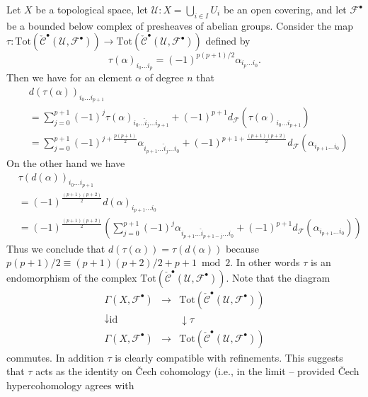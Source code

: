 \noindent
Let $X$ be a topological space, let $\mathcal{U} : X = \bigcup_{i \in I} U_i$
be an open covering, and let $\mathcal{F}^\bullet$ be a bounded below
complex of presheaves of abelian groups. Consider the map
$\tau :
\text{Tot}(\check{\mathcal{C}}^\bullet({\mathcal U}, {\mathcal F}^\bullet))
\to
\text{Tot}(\check{\mathcal{C}}^\bullet({\mathcal U}, {\mathcal F}^\bullet))$
defined by
$$
\tau(\alpha)_{i_0 \ldots i_p} = (-1)^{p(p + 1)/2} \alpha_{i_p \ldots i_0}.
$$
Then we have for an element $\alpha$ of degree $n$ that
\begin{align*}
& d(\tau(\alpha))_{i_0 \ldots i_{p + 1}} \\
& =
\sum\nolimits_{j = 0}^{p + 1}
(-1)^j
\tau(\alpha)_{i_0 \ldots \hat i_j \ldots i_{p + 1}}
+
(-1)^{p + 1}
d_{\mathcal F}(\tau(\alpha)_{i_0 \ldots i_{p + 1}})
\\
& =
\sum\nolimits_{j = 0}^{p + 1}
(-1)^{j + \frac{p(p + 1)}{2}}
\alpha_{i_{p + 1} \ldots \hat i_j \ldots i_0}
+
(-1)^{p + 1 + \frac{(p + 1)(p + 2)}{2}}
d_{\mathcal F}(\alpha_{i_{p + 1} \ldots i_0})
\end{align*}
On the other hand we have
\begin{align*}
& \tau(d(\alpha))_{i_0\ldots i_{p + 1}} \\
& =
(-1)^{\frac{(p + 1)(p + 2)}{2}} d(\alpha)_{i_{p + 1} \ldots i_0}
\\
& =
(-1)^{\frac{(p + 1)(p + 2)}{2}}
\left(
\sum\nolimits_{j = 0}^{p + 1}
(-1)^j
\alpha_{i_{p + 1}\ldots \hat i_{p + 1 - j} \ldots i_0}
+
(-1)^{p + 1}
d_{\mathcal F}(\alpha_{i_{p + 1}\ldots i_0})
\right)
\end{align*}
Thus we conclude that $d(\tau(\alpha)) = \tau(d(\alpha))$
because $p(p + 1)/2 \equiv (p + 1)(p + 2)/2 + p + 1 \bmod 2$. In other words
$\tau$ is an endomorphism of the complex
$\text{Tot}(\check{\mathcal{C}}^\bullet({\mathcal U}, {\mathcal F}^\bullet))$.
Note that the diagram
$$
\begin{matrix}
\Gamma(X, {\mathcal F}^\bullet) &
\longrightarrow &
\text{Tot}(\check{\mathcal{C}}^\bullet({\mathcal U}, {\mathcal F}^\bullet)) \\
\downarrow \text{id} & & \downarrow \tau \\
\Gamma(X, {\mathcal F}^\bullet) &
\longrightarrow &
\text{Tot}(\check{\mathcal{C}}^\bullet({\mathcal U}, {\mathcal F}^\bullet))
\end{matrix}
$$
commutes. In addition $\tau$ is clearly compatible with refinements.
This suggests that $\tau$ acts as the identity on {\v C}ech cohomology
(i.e., in the limit -- provided {\v C}ech hypercohomology agrees with
